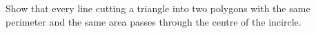 Show that every line cutting a triangle into two polygons with the same perimeter and the same area passes through the centre of the incircle.
